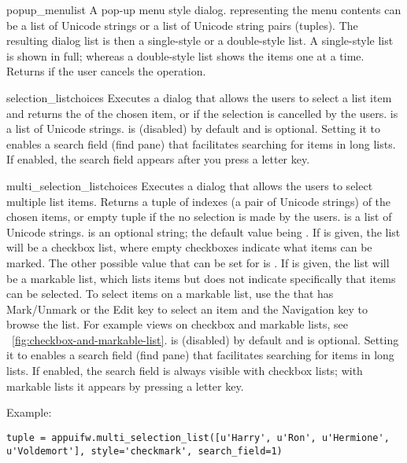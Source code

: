 \begin{funcdesc}{popup_menu}{list}
A pop-up menu style dialog.  representing the menu 
contents can be a list of Unicode strings or a list of Unicode string pairs 
(tuples). The resulting dialog list is then a single-style or a double-style 
list. A single-style list is shown in full; whereas a double-style list 
shows the items one at a time. Returns  if the user cancels the 
operation.
\end{funcdesc}

\begin{funcdesc}{selection_list}{choices}
Executes a dialog that allows the users to select a list item and
returns the  of the chosen item, or  if the
selection is cancelled by the users.  is a list of
Unicode strings.
 is  (disabled) by default and is optional. Setting it to  enables a search field (find pane) that facilitates searching for items in long lists. If enabled, the search field appears after you press a letter key.
\end{funcdesc}

\begin{funcdesc}{multi_selection_list}{choices}
  Executes a dialog that allows the users to select multiple list
  items.  Returns a tuple of indexes (a pair of Unicode strings) of
  the chosen items, or empty tuple if the no selection is made by
  the users.  is a list of Unicode strings.  
  is an optional string; the default value being .
  If  is given, the list will be a checkbox list,
  where empty checkboxes indicate what items can be marked. The other
  possible value that can be set for  is
  . If  is given, the list will be
  a markable list, which lists items but does not indicate
  specifically that items can be selected. To select items on a
  markable list, use the  that has
  Mark/Unmark or the Edit key to select an item and the 
  Navigation key to browse the list. For example views on checkbox and
  markable lists, see
  \figurename~\ref{fig:checkbox-and-markable-list}.
   is  (disabled) by default and is
  optional. Setting it to  enables a search field (find pane)
  that facilitates searching for items in long lists. If enabled, the
  search field is always visible with checkbox lists; with markable
  lists it appears by pressing a letter key.

Example:
\begin{verbatim}
tuple = appuifw.multi_selection_list([u'Harry', u'Ron', u'Hermione', u'Voldemort'], style='checkmark', search_field=1)
\end{verbatim}
\end{funcdesc}


